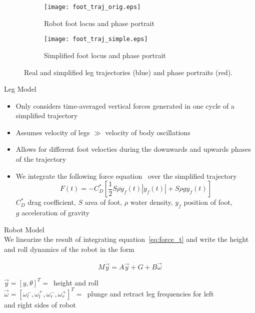 \vspace{-1EX}
\begin{figure}[tb]
\centering
\begin{subfigure}[t]{0.47\textwidth}
    \centering
    \texttt{[image: foot\_traj\_orig.eps]}
    \caption{Robot foot locus and phase portrait}
    \label{fig:trajrob}
\end{subfigure}
\quad
\begin{subfigure}[t]{0.47\textwidth}
    \centering
    \texttt{[image: foot\_traj\_simple.eps]}
    \caption{Simplified foot locus and phase portrait} 
    \label{fig:trajsimp}
\end{subfigure}
\vspace{0.5EX}
\caption{Real and simplified leg trajectories (blue) and phase portraits (red).}
\label{fig:traj}
\end{figure}

\textcolor{prime}{\textsf{Leg Model}}
\begin{itemize}
    \item Only considers time-averaged vertical forces generated in one cycle of a simplified trajectory
    \item Assumes velocity of legs $\gg$ velocity of body oscillations
    \item Allows for different foot velocties during the downwards and upwards phases of the trajectory
    \item We integrate the following force equation~\cite{glasheen1996vertical} over the simplified trajectory
        \begin{equation}
            F(t) = - C_D^* \left[\frac{1}{2} S \rho \dot{y}_f(t) |\dot{y}_f(t) | + S \rho g y_f(t) \right]
            \label{eq:force_t}
        \end{equation}
\hspace{1EM} $C_D^*$ drag coefficient, $S$ area of foot, $\rho$ water density, $y_f$ position of foot, \\ \hspace{1EM} $g$ acceleration of gravity
\end{itemize}
\vspace{1EX}

\textcolor{prime}{\textsf{Robot Model}} \\
We linearize the result of integrating equation~\ref{eq:force_t} and write the height and roll dynamics of the robot in the form

\begin{equation}
    M \ddot{\vec{y}} = A \vec{y} + G + B \vec{\omega} 
    \label{eq:rob_dyn}
\end{equation}

\hspace{1EM} $\vec{y} = [y, \theta]^T = $\  height and roll \\

\hspace{1EM} $\vec{\omega} = [\omega^-_l, \omega^+_l, \omega^-_r, \omega^+_r]^T = $\ plunge and retract leg frequencies for left \\ \hspace{1EM} and right sides of robot
